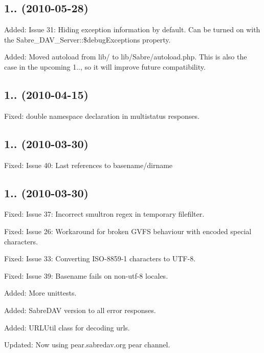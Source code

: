 \subsection*{1.. (2010-\/05-\/28) }


\begin{DoxyItemize}
\item Added\+: Issue 31\+: Hiding exception information by default. Can be turned on with the Sabre\+\_\+\+D\+A\+V\+\_\+\+Server\+::\$debug\+Exceptions property.
\item Added\+: Moved autoload from lib/ to lib/\+Sabre/autoload.\+php. This is also the case in the upcoming 1.., so it will improve future compatibility.
\end{DoxyItemize}

\subsection*{1.. (2010-\/04-\/15) }


\begin{DoxyItemize}
\item Fixed\+: double namespace declaration in multistatus responses.
\end{DoxyItemize}

\subsection*{1.. (2010-\/03-\/30) }


\begin{DoxyItemize}
\item Fixed\+: Issue 40\+: Last references to basename/dirname
\end{DoxyItemize}

\subsection*{1.. (2010-\/03-\/30) }


\begin{DoxyItemize}
\item Fixed\+: Issue 37\+: Incorrect smultron regex in temporary filefilter.
\item Fixed\+: Issue 26\+: Workaround for broken G\+V\+FS behaviour with encoded special characters.
\item Fixed\+: Issue 33\+: Converting I\+S\+O-\/8859-\/1 characters to U\+T\+F-\/8.
\item Fixed\+: Issue 39\+: Basename fails on non-\/utf-\/8 locales.
\item Added\+: More unittests.
\item Added\+: Sabre\+D\+AV version to all error responses.
\item Added\+: U\+R\+L\+Util class for decoding urls.
\item Updated\+: Now using pear.\+sabredav.\+org pear channel.
\end{DoxyItemize}

